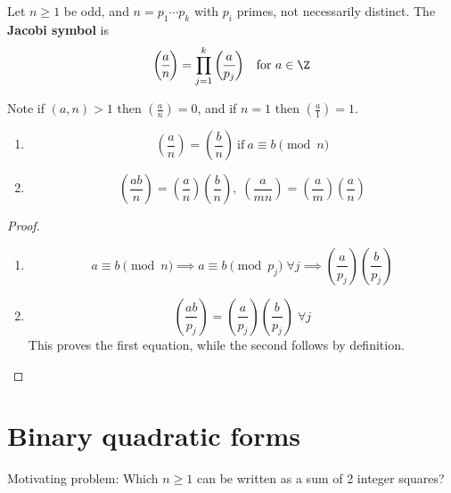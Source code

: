 \documentclass{article}
\newcommand{\legendre}[2]{\genfrac{(}{)}{}{}{#1}{#2}}
\begin{document}
\begin{defi}
    Let $n \geq 1$ be odd, and $n = p_1 \dotsm p_k$ with $p_i$ primes, not necessarily distinct.
    The \textbf{Jacobi symbol} is
    \begin{equation*}
        \legendre{a}{n} = \prod_{j=1}^k \legendre{a}{p_j} \quad \text{for } a \in \Z
    \end{equation*}

    Note if $(a, n) > 1$ then $\legendre{a}{n} = 0$, and if $n=1$ then $\legendre{a}{1} = 1$.
\end{defi}

\begin{nprop}\label{prop:3.5}
    \begin{enumerate}[label=(\roman*)]
        \item
            \begin{equation*}
                \legendre{a}{n} = \legendre{b}{n} \ \text{if} \ a \equiv b \pmod{n}
            \end{equation*}
        \item
            \begin{equation*}
                \legendre{ab}{n} = \legendre{a}{n} \legendre{b}{n}, \; \legendre{a}{mn} = \legendre{a}{m} \legendre{a}{n}
            \end{equation*}
    \end{enumerate}
\end{nprop}

\begin{proof}
    \begin{enumerate}[label=(\roman*)]
        \item
            \begin{equation*}
                a \equiv b \pmod{n} \implies a \equiv b \pmod{p_j} \; \forall j \implies \legendre{a}{p_j} \legendre{b}{p_j}
            \end{equation*}
        \item
            \begin{equation*}
                \legendre{ab}{p_j} = \legendre{a}{p_j} \legendre{b}{p_j} \; \forall j
            \end{equation*}
            This proves the first equation, while the second follows by definition.
    \end{enumerate}
\end{proof}


\section{Binary quadratic forms}
Motivating problem: Which $n \geq 1$ can be written as a sum of 2 integer squares?
\end{document}
